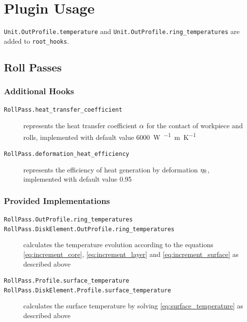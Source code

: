 \documentclass{scrartcl}
\begin{document}
    \section{Plugin Usage}\label{sec:plugin-usage}

    \texttt{Unit.OutProfile.temperature} and \texttt{Unit.OutProfile.ring\_temperatures} are added to \texttt{root\_hooks}.

    \subsection{Roll Passes}

    \subsubsection{Additional Hooks}

    \begin{description}
        \item[\texttt{RollPass.heat\_transfer\_coefficient}] represents the heat transfer coefficient ${\alpha}$ for the contact of workpiece and rolls, implemented with default value \qty{6000}{\watt\per\squared\meter\per\kelvin}
        \item[\texttt{RollPass.deformation\_heat\_efficiency}] represents the efficiency of heat generation by deformation ${\eta_\mathrm{S}}$, implemented with default value \num{0.95}
    \end{description}

    \subsubsection{Provided Implementations}

    \begin{description}
        \item[\texttt{RollPass.OutProfile.ring\_temperatures}]
        \item[\texttt{RollPass.DiskElement.OutProfile.ring\_temperatures}] calculates the temperature evolution according to the equations \autoref{eq:increment_core}, \autoref{eq:increment_layer} and \autoref{eq:increment_surface} as described above
        \item[\texttt{RollPass.Profile.surface\_temperature}]
        \item[\texttt{RollPass.DiskElement.Profile.surface\_temperature}] calculates the surface temperature by solving \autoref{eq:surface_temperature} as described above
    \end{description}
\end{document}

